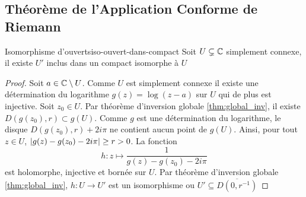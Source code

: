 \documentclass{cours}
\begin{document}
\subsection{Théorème de l'Application Conforme de Riemann}
\begin{lemme}
	{Isomorphisme d'ouverts}{iso-ouvert-dans-compact}
	Soit $U \subsetneq \mathbb{C}$ simplement connexe, il existe $U'$ inclus dans un compact isomorphe à $U$
\end{lemme}
\begin{proof}
	Soit $a \in \mathbb{C} \setminus U$. 
	Comme $U$ est simplement connexe il existe une détermination du logarithme $g(z) = \log(z - a)$ sur $U$ qui de plus est injective. 
	Soit $z_{0} \in U$. Par théorème d'inversion globale \ref{thm:global_inv}, il existe $D(g(z_{0}), r)\subset g(U)$. 
	Comme $g$ est une détermination du logarithme, le disque $D(g(z_{0}), r) + 2i\pi$ ne contient aucun point de $g(U)$. 
		Ainsi, pour tout $z \in U$, $\left|g(z) - g(z_{0}) - 2i\pi\right| \geq r > 0$. 
		La fonction 
		\begin{equation*}
			h : z \longmapsto \frac{1}{g(z)  - g(z_{0}) - 2i\pi}
		\end{equation*}
		est holomorphe, injective et bornée sur $U$.
		Par théorème d'inversion globale \ref{thm:global_inv}, $h: U \to U'$ est un isomorphisme ou $U' \subseteq \overline{D\left(0, r^{-1}\right)}$
\end{proof}
\end{document}
